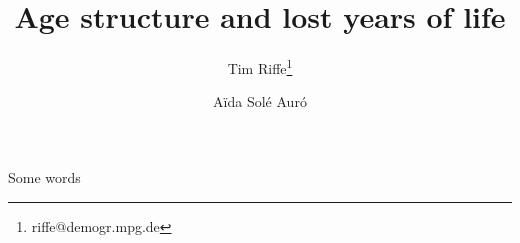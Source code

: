 \documentclass{article}
\begin{document}
\title{Age structure and lost years of life}

\author[1]{Tim Riffe\thanks{riffe@demogr.mpg.de}}
\author[2]{A{\"i}da Sol\'{e} Aur\'{o}}

\maketitle

Some words
\end{document}
